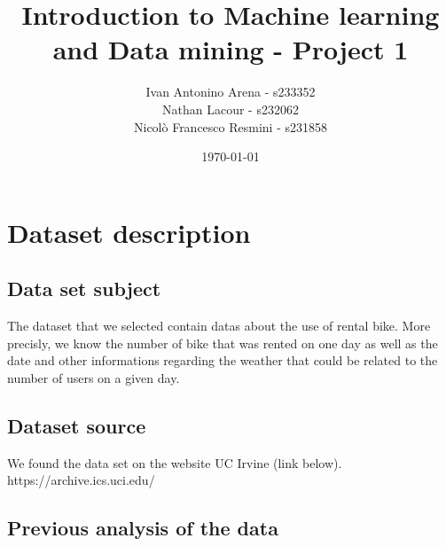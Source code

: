\documentclass[11pt,a4paper]{article}
\begin{document}
 

\title{Introduction to Machine learning and Data mining - Project 1} %

\author{Ivan Antonino Arena - s233352 \\
 Nathan Lacour - s232062 \\
 Nicolò Francesco Resmini - s231858  }  %
 
\date{\today}

\maketitle

\section{Dataset description}

\subsection*{Data set subject}
The dataset that we selected contain datas about the use of rental bike. More precisly, we know the number of bike that was rented on one day as well as the date and other informations regarding the weather that could be related to the number of users on a given day.

\subsection*{Dataset source}
We found the data set on the website UC Irvine (link below).\\
https://archive.ics.uci.edu/

\subsection*{Previous analysis of the data}
\end{document}

